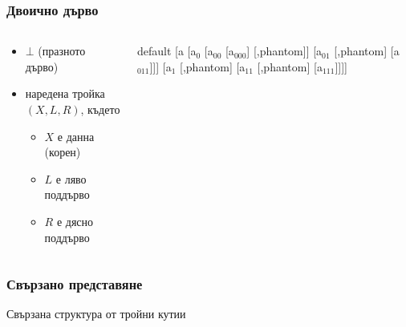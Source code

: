 \documentclass[alsotrans]{beamerswitch}
\newcommand{\samplebintree}{%
      \begin{forest}
        default
        [a [a$_0$ [a$_{00}$ [a$_{000}$] [,phantom]] [a$_{01}$ [,phantom] [a$_{011}$]]] [a$_1$ [,phantom] [a$_{11}$ [,phantom] [a$_{111}$]]]]
      \end{forest}%
}
\begin{document}
\begin{frame}
  \frametitle{Двоично дърво}
  \begin{columns}[t,onlytextwidth]
    \begin{column}{0.5\textwidth}
      \begin{definition}
        \begin{itemize}
        \item $\bot$ (празното дърво)
        \item наредена тройка $(X, L, R)$, където
          \begin{itemize}
          \item $X$ е данна (корен)
          \item $L$ е ляво поддърво
          \item $R$ е дясно поддърво
          \end{itemize}
        \end{itemize}
      \end{definition}
    \end{column}
    \begin{column}{0.5\textwidth}
      \vspace{4ex}
      \begin{center}
        \samplebintree
      \end{center}
    \end{column}
  \end{columns}
\end{frame}

\begin{frame}
  \frametitle{Свързано представяне}
  Свързана структура от тройни кутии\\[6ex]
  \begin{center}
    \small
  \end{center}
\end{frame}
\end{document}

